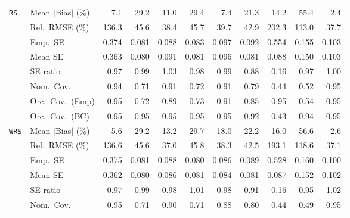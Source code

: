 \begin{landscape}
\begin{longtable}{llrrrrrrrrr}
\addlinespace[2pt]
\quad \texttt{RS} & Mean $|$Bias$|$ (\%) & \cellcolor{ranktwo}7.1 & 29.2 & 11.0 & 29.4 & \cellcolor{rankthree}7.4 & 21.3 & 14.2 & 55.4 & \cellcolor{rankone}2.4 \\
 & Rel.\ RMSE (\%) & 136.3 & 45.6 & \cellcolor{ranktwo}38.4 & 45.7 & \cellcolor{rankthree}39.7 & 42.9 & 202.3 & 113.0 & \cellcolor{rankone}37.7 \\
 & Emp.\ SE & 0.374 & 0.081 & 0.088 & 0.083 & 0.097 & 0.092 & 0.554 & 0.155 & 0.103 \\
 & Mean SE & 0.363 & 0.080 & 0.091 & 0.081 & 0.096 & 0.081 & 0.088 & 0.150 & 0.103 \\
 & SE ratio & 0.97 & \cellcolor{ranktwo}0.99 & 1.03 & \cellcolor{rankthree}0.98 & \cellcolor{ranktwo}0.99 & 0.88 & 0.16 & 0.97 & \cellcolor{rankone}1.00 \\
 & Nom.\ Cov. & \cellcolor{ranktwo}0.94 & 0.71 & \cellcolor{rankthree}0.91 & 0.72 & \cellcolor{rankthree}0.91 & 0.79 & 0.44 & 0.52 & \cellcolor{rankone}0.95 \\
 & Orc.\ Cov.\ (Emp) & \cellcolor{rankone}0.95 & 0.72 & \cellcolor{rankthree}0.89 & 0.73 & \cellcolor{ranktwo}0.91 & 0.85 & \cellcolor{rankone}0.95 & 0.54 & \cellcolor{rankone}0.95 \\
 & Orc.\ Cov.\ (BC) & \cellcolor{rankone}0.95 & \cellcolor{rankone}0.95 & \cellcolor{rankone}0.95 & \cellcolor{rankone}0.95 & \cellcolor{rankone}0.95 & \cellcolor{rankthree}0.92 & 0.43 & \cellcolor{ranktwo}0.94 & \cellcolor{rankone}0.95 \\
\addlinespace[2pt]
\quad \texttt{WRS} & Mean $|$Bias$|$ (\%) & \cellcolor{ranktwo}5.6 & 29.2 & \cellcolor{rankthree}13.2 & 29.7 & 18.0 & 22.2 & 16.0 & 56.6 & \cellcolor{rankone}2.6 \\
 & Rel.\ RMSE (\%) & 136.6 & 45.6 & \cellcolor{rankone}37.0 & 45.8 & \cellcolor{rankthree}38.3 & 42.5 & 193.1 & 118.6 & \cellcolor{ranktwo}37.1 \\
 & Emp.\ SE & 0.375 & 0.081 & 0.088 & 0.080 & 0.086 & 0.089 & 0.528 & 0.160 & 0.100 \\
 & Mean SE & 0.362 & 0.080 & 0.086 & 0.081 & 0.084 & 0.081 & 0.087 & 0.152 & 0.102 \\
 & SE ratio & \cellcolor{rankthree}0.97 & \cellcolor{rankone}0.99 & \cellcolor{ranktwo}0.98 & \cellcolor{rankone}1.01 & \cellcolor{ranktwo}0.98 & 0.91 & 0.16 & 0.95 & \cellcolor{ranktwo}1.02 \\
 & Nom.\ Cov. & \cellcolor{rankone}0.95 & 0.71 & \cellcolor{ranktwo}0.90 & 0.71 & \cellcolor{rankthree}0.88 & 0.80 & 0.44 & 0.49 & \cellcolor{rankone}0.95 \\

\end{longtable}
\end{landscape}
